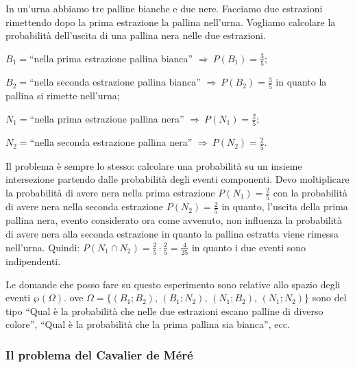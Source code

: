 \begin{exrig}
\begin{esempio}
In un'urna abbiamo tre palline bianche e due nere. Facciamo due estrazioni rimettendo dopo la prima estrazione la pallina nell'urna. Vogliamo calcolare la probabilità dell'uscita di una pallina nera nelle due estrazioni.
\begin{description*}
\item $B_{1}=$``nella prima estrazione pallina bianca'' $\Rightarrow\: P(B_1)=\frac 3 5$;
\item $B_{2}=$``nella seconda estrazione pallina bianca'' $\Rightarrow\: P(B_2)=\frac 3 5$ in quanto la pallina si rimette nell'urna;
\item $N_{1}=$``nella prima estrazione pallina nera'' $\Rightarrow\: P(N_1)=\frac 2 5$;
\item $N_{2}=$``nella seconda estrazione pallina nera'' $\Rightarrow\: P(N_2)=\frac 2 5$.
\end{description*}
Il problema è sempre lo stesso: calcolare una probabilità su un insieme intersezione partendo dalle probabilità degli eventi componenti. Devo moltiplicare la probabilità di avere nera nella prima estrazione $P(N_1)=\frac 2 5$ con la probabilità di avere nera nella seconda estrazione $P(N_2)=\frac 2 5$ in quanto, l'uscita della prima pallina nera, evento considerato ora come avvenuto, non influenza la probabilità di avere nera alla seconda estrazione in quanto la pallina estratta viene rimessa nell'urna. Quindi: $P(N_1\cap N_2)=\frac 2 5\cdot \frac 2 5=\frac 4{25}$ in quanto i due eventi sono indipendenti.
\begin{center}
 
\end{center}

Le domande che posso fare su questo esperimento sono relative allo spazio degli eventi $\wp(\Omega).$ ove $\Omega =\{(B_1;B_2)$, $(B_1;N_2)$, $(N_1;B_2)$, $(N_1;N_2)\}$ sono del tipo ``Qual è la probabilità che nelle due estrazioni escano palline di diverso colore'', ``Qual è la probabilità che la prima pallina sia bianca'', ecc.
\end{esempio}
\end{exrig}

\subsubsection*{Il problema del Cavalier de Méré}

